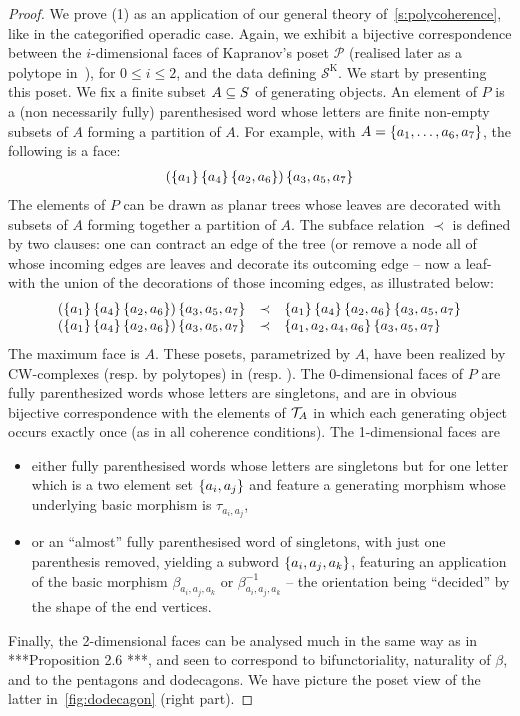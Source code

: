 \begin{proof}
 We prove (1) as an application of our general theory of~\cref{s:polycoherence}, like in the categorified operadic case. Again, we  exhibit  a bijective correspondence between the $i$-dimensional faces of Kapranov's poset ${\mathcal P}$ (realised later as a polytope in~\cite{reinerCoxeterassociahedra1994}), for $0\leq i\leq 2$, and the data defining $\mathcal{S}^{\mathrm{K}}$.  We start by presenting this poset. We fix a finite  subset $A\subseteq S$ of generating objects. 
 An element of $P$ is a (non necessarily fully) parenthesised word whose letters are finite non-empty subsets of $A$ forming a partition of $A$.  For example, with $A=\left\{a_1,\ldots,a_6,a_7\right\}$, the following is a face:
 $$\begin{array}{l}
 (\left\{a_1\right\} \left\{a_4\right\} \left\{a_2,a_6\right\}) \left\{a_3,a_5,a_7\right\}
 \end{array}$$
The elements of $P$ can be drawn as planar trees whose leaves are decorated with subsets of $A$ forming together a partition of $A$.  The subface relation $\prec$ is defined by two clauses: one can contract an edge of the tree (or remove a node all of whose  incoming edges are leaves and decorate its outcoming edge -- now a leaf- with the union of the decorations of those incoming edges, as illustrated below:
$$\begin{array}{lll}
 (\left\{a_1\right\} \left\{a_4\right\} \left\{a_2,a_6\right\}) \left\{a_3,a_5,a_7\right\} & \prec & \left\{a_1\right\} \left\{a_4\right\} \left\{a_2,a_6\right\} \left\{a_3,a_5,a_7\right\} \\
 (\left\{a_1\right\} \left\{a_4\right\} \left\{a_2,a_6\right\}) \left\{a_3,a_5,a_7\right\} & \prec &  \left\{a_1,a_2,a_4,a_6\right\} \left\{a_3,a_5,a_7\right\}
 \end{array}$$
 The maximum face is $A$.
These posets, parametrized by $A$, have been realized by CW-complexes (resp. by polytopes) in \cite{kapranov1993} (resp. \cite{reinerCoxeterassociahedra1994}).
The 0-dimensional faces of $P$ are fully parenthesized words whose letters are singletons, and are in obvious bijective correspondence with the elements of ${\cal T}_A$ in which each generating object occurs exactly once (as in all coherence conditions).  The 1-dimensional faces are 
\begin{itemize}
\item
either fully parenthesised words whose letters are singletons but for one letter which is a two element set $\left\{a_i,a_j\right\}$ and feature a generating morphism whose underlying basic morphism is $\tau_{a_i,a_j}$, 
\item or an ``almost'' fully parenthesised word of singletons, with just one parenthesis removed, yielding a subword $\left\{a_i,a_j,a_k\right\}$, featuring an application of the basic morphism $\beta_{a_i,a_j,a_k}$ or $\beta_{a_i,a_j,a_k}^{-1}$
-- the orientation being ``decided'' by	 the shape of the end vertices.
\end{itemize}
Finally, the 2-dimensional faces can be analysed much in the same way as in  ***Proposition 2.6 ***, and seen to correspond to bifunctoriality, naturality of $\beta$, and to the pentagons and dodecagons. We have picture the poset view of the 
latter in~\cref{fig:dodecagon} (right part).
\end{proof}

